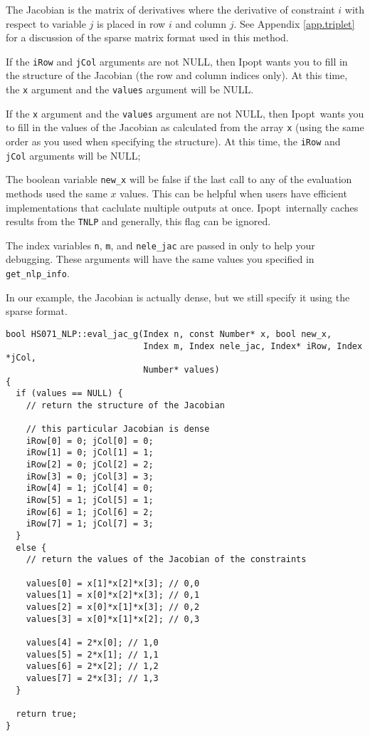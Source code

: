 \documentclass[letter,10pt]{article}
\newcommand{\Ipopt}{{\sc Ipopt}}
\begin{document}
The Jacobian is the matrix of derivatives where
the derivative of constraint $i$ with respect to variable $j$ is
placed in row $i$ and column $j$. See Appendix \ref{app.triplet} for a discussion of 
the sparse matrix format used in this method.

If the {\tt iRow} and {\tt jCol} arguments are not NULL, then \Ipopt
wants you to fill in the structure of the Jacobian (the row and column
indices only). At this time, the {\tt x} argument and the {\tt values}
argument will be NULL.

If the {\tt x} argument and the {\tt values} argument are not NULL,
then \Ipopt\ wants you to fill in the values of the Jacobian as
calculated from the array {\tt x} (using the same order as you used
when specifying the structure). At this time, the {\tt iRow} and {\tt
jCol} arguments will be NULL;

The boolean variable {\tt new\_x} will be false if the last call to
any of the evaluation methods used the same $x$ values. This can be
helpful when users have efficient implementations that caclulate
multiple outputs at once. \Ipopt\ internally caches results from the
{\tt TNLP} and generally, this flag can be ignored.

The index variables {\tt n}, {\tt m}, and {\tt nele\_jac} are passed
in only to help your debugging. These arguments will have the same
values you specified in {\tt get\_nlp\_info}.

In our example, the Jacobian is actually dense, but we still
specify it using the sparse format.

\begin{footnotesize}
\begin{verbatim}
bool HS071_NLP::eval_jac_g(Index n, const Number* x, bool new_x,
                           Index m, Index nele_jac, Index* iRow, Index *jCol,
                           Number* values)
{
  if (values == NULL) {
    // return the structure of the Jacobian

    // this particular Jacobian is dense
    iRow[0] = 0; jCol[0] = 0;
    iRow[1] = 0; jCol[1] = 1;
    iRow[2] = 0; jCol[2] = 2;
    iRow[3] = 0; jCol[3] = 3;
    iRow[4] = 1; jCol[4] = 0;
    iRow[5] = 1; jCol[5] = 1;
    iRow[6] = 1; jCol[6] = 2;
    iRow[7] = 1; jCol[7] = 3;
  }
  else {
    // return the values of the Jacobian of the constraints
    
    values[0] = x[1]*x[2]*x[3]; // 0,0
    values[1] = x[0]*x[2]*x[3]; // 0,1
    values[2] = x[0]*x[1]*x[3]; // 0,2
    values[3] = x[0]*x[1]*x[2]; // 0,3

    values[4] = 2*x[0]; // 1,0
    values[5] = 2*x[1]; // 1,1
    values[6] = 2*x[2]; // 1,2
    values[7] = 2*x[3]; // 1,3
  }

  return true;
}
\end{verbatim}
\end{footnotesize}
\end{document}
